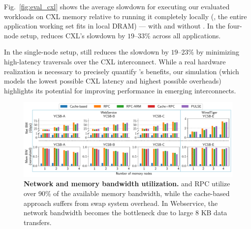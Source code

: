  
Fig.~\ref{fig:eval_cxl} shows the average slowdown for executing our evaluated workloads on CXL memory relative to running it completely locally (\ie, the entire application working set fits in local DRAM) --- with and without \pulse. In the four-node setup, \pulse reduces CXL's slowdown by $19$--$33$\% across all applications. 

In the single-node setup, \pulse still reduces the slowdown by $19$--$23$\% by minimizing high-latency traversals over the CXL interconnect. While a real hardware realization is necessary to precisely quantify \pulse's benefits, our simulation (which models the lowest possible CXL latency and highest possible \pulse overheads) highlights its potential for improving performance in emerging interconnects.

\begin{figure}[t]
\centering
  \includegraphics[width=\textwidth]{fig/pulse/network_memory.pdf}
  \caption[Network and memory bandwidth utilization]{\textbf{Network and memory bandwidth utilization.} \pulse and RPC utilize over 90\% of the available memory bandwidth, while the cache-based approach suffers from swap system overhead. In Webservice, the network bandwidth becomes the bottleneck due to large 8 KB data transfers.}
\label{fig:sup_eval_perf_e2e_utilization}
\end{figure}


